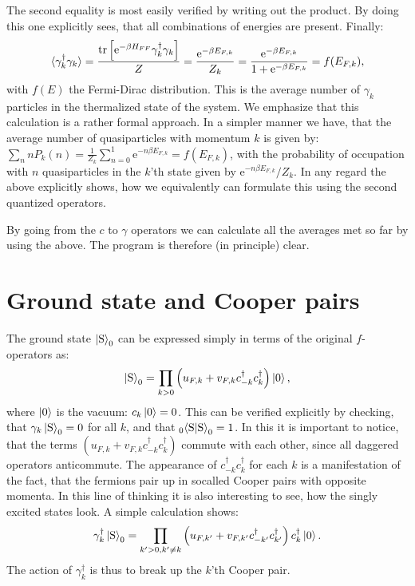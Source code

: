 The second equality is most easily verified by writing out the product. By doing this one explicitly sees, that all combinations of energies are present. Finally: 
\begin{equation}
\braket{\gamma^\dagger_k\gamma_k} = \frac{\operatorname{tr}\left[\text{e}^{-\beta H_{FF}}\gamma^\dagger_k\gamma_k\right]}{Z} = \frac{\text{e}^{-\beta E_{F,k}}}{Z_k} = \frac{\text{e}^{-\beta E_{F,k}}}{1 + \text{e}^{-\beta E_{F,k}}} = f(E_{F,k}),
\end{equation}
with $f(E)$ the Fermi-Dirac distribution. This is the average number of $\gamma_k$ particles in the thermalized state of the system. We emphasize that this calculation is a rather formal approach. In a simpler manner we have, that the average number of quasiparticles with momentum $k$ is given by: $\sum_n n P_k(n) = \frac{1}{Z_k}\sum_{n = 0}^{1} \text{e}^{ -n\beta E_{F,k} } = f( E_{F,k} )$, with the probability of occupation with $n$ quasiparticles in the $k$'th state given by $\text{e}^{-n\beta E_{F,k}}/Z_k$. In any regard the above explicitly shows, how we equivalently can formulate this using the second quantized operators. 

By going from the $c$ to $\gamma$ operators we can calculate all the averages met so far by using the above. The program is therefore (in principle) clear. 

\section{Ground state and Cooper pairs}
The ground state $\ket{\text{S}}_0$ can be expressed simply in terms of the original $f$-operators as:
\begin{equation}
\ket{\text{S}}_0 = \prod_{k > 0} \left(u_{F,k} + v_{F,k}c^\dagger_{-k}c^\dagger_k\right)\ket{0},
\end{equation} 
where $\ket{0}$ is the vacuum: $c_k\ket{0} = 0$. This can be verified explicitly by checking, that $\gamma_k\ket{\text{S}}_0 = 0$ for all $k$, and that $_{0}\!\braket{\text{S}|\text{S}}_0 = 1$. In this it is important to notice, that the terms $(u_{F,k} + v_{F,k}c^\dagger_{-k}c^\dagger_k)$ commute with each other, since all daggered operators anticommute. The appearance of $c^\dagger_{-k}c^\dagger_k$ for each $k$ is a manifestation of the fact, that the fermions pair up in socalled Cooper pairs with opposite momenta. In this line of thinking it is also interesting to see, how the singly excited states look. A simple calculation shows:
\begin{equation}
\gamma^\dagger_k\ket{\text{S}}_0 = \prod_{k' > 0, k' \neq k }\left(u_{F,k'} + v_{F,k'}c^\dagger_{-k'}c^\dagger_{k'}\right)c^\dagger_k\ket{0}.
\end{equation}
The action of $\gamma^\dagger_k$ is thus to break up the $k$'th Cooper pair. 

